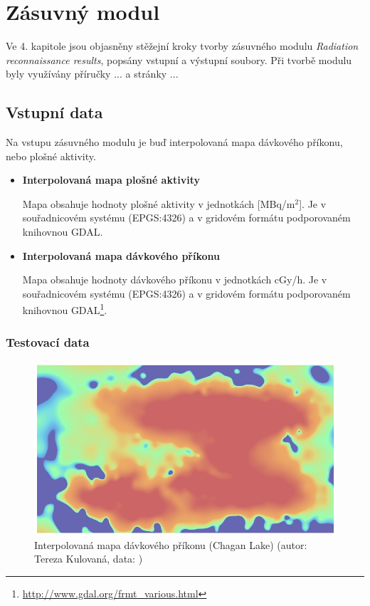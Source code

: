 \chapter{Zásuvný modul}
\label{4-plugin}

Ve 4. kapitole jsou objasněny stěžejní kroky tvorby zásuvného modulu \textit{Radiation reconnaissance results}, popsány vstupní a výstupní soubory. Při tvorbě modulu byly využívány příručky ... a stránky ...\cite{diveIntoPython}

\section{Vstupní data}

Na vstupu zásuvného modulu je buď interpolovaná mapa dávkového příkonu, nebo plošné aktivity.

\begin{itemize}
	\item \textbf{Interpolovaná mapa plošné aktivity}

Mapa obsahuje hodnoty plošné aktivity v jednotkách {[}MBq/m$^2${]}. Je v souřadnicovém systému  (EPGS:4326) a v gridovém formátu podporovaném knihovnou GDAL. 

	\item \textbf{Interpolovaná mapa dávkového příkonu}

Mapa obsahuje hodnoty dávkového příkonu v jednotkách cGy/h. Je v souřadnicovém systému  (EPGS:4326) a v gridovém formátu podporovaném knihovnou GDAL\footnote{\url{http://www.gdal.org/frmt_various.html}}.
	
\end{itemize}

\subsection{Testovací data}

\begin{figure}[H]
    \centering
      \includegraphics[width=350pt]{./pictures/chagan_spline.jpg}
      \caption[Interpolovaná mapa]{Interpolovaná mapa dávkového příkonu (Chagan Lake) (autor: Tereza Kulovaná, data: )}
      \label{fig:spline}
\end{figure}

